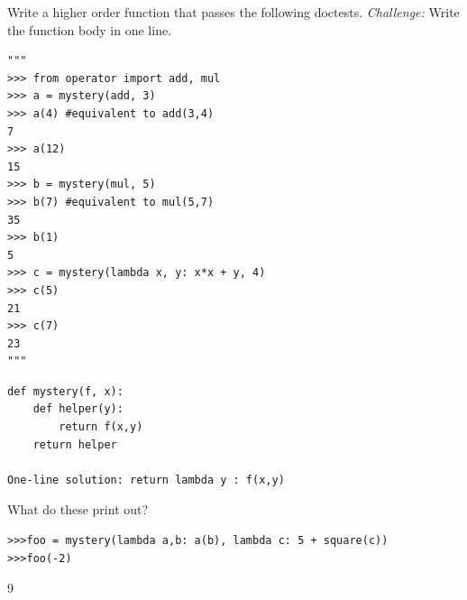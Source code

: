 \documentclass{exam}
\begin{document}
\begin{questions}


\begin{blocksection}
\question Write a higher order function that passes the following doctests. \emph{Challenge:} Write the function body in one line.

\begin{lstlisting}
"""
>>> from operator import add, mul
>>> a = mystery(add, 3)
>>> a(4) #equivalent to add(3,4)
7 
>>> a(12)
15
>>> b = mystery(mul, 5)
>>> b(7) #equivalent to mul(5,7)
35
>>> b(1)
5
>>> c = mystery(lambda x, y: x*x + y, 4)
>>> c(5)
21
>>> c(7)
23
"""
\end{lstlisting}

\begin{solution}[2in]
\begin{lstlisting}
def mystery(f, x):
	def helper(y):
		return f(x,y)
	return helper

One-line solution: return lambda y : f(x,y)
\end{lstlisting}
\end{solution}
\end{blocksection}

\question What do these print out?
\begin{lstlisting}
>>>foo = mystery(lambda a,b: a(b), lambda c: 5 + square(c))
>>>foo(-2)
\end{lstlisting}

\begin{solution}
9
\end{solution}

\end{questions}
\end{document}
